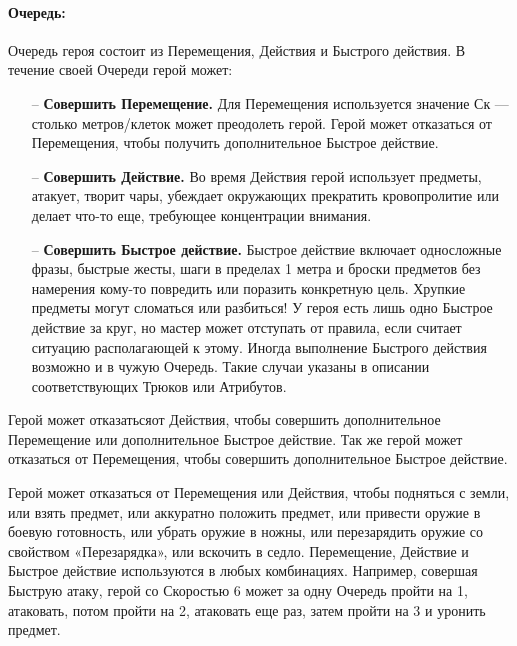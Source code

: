 \paragraph{Очередь:} Очередь героя состоит из Перемещения, Действия и Быстрого действия. В течение своей Очереди герой может:
\begin{itemize}
\item[--] \textbf{Совершить Перемещение.} Для Перемещения используется значение Ск — столько метров/клеток может преодолеть герой. Герой может отказаться от Перемещения, чтобы получить дополнительное Быстрое действие.
\item[--] \textbf{Совершить Действие.} Во время Действия герой использует предметы, атакует, творит чары, убеждает окружающих прекратить кровопролитие или делает что-то еще, требующее концентрации внимания.
\item[--] \textbf{Совершить Быстрое действие.} Быстрое действие включает односложные фразы, быстрые жесты, шаги в пределах 1 метра и броски предметов без намерения кому-то повредить или поразить конкретную цель. Хрупкие предметы могут сломаться или разбиться! У героя есть лишь одно Быстрое действие за круг, но мастер может отступать от правила, если считает ситуацию располагающей к этому. Иногда выполнение Быстрого действия возможно и в чужую Очередь. Такие случаи указаны в описании соответствующих Трюков или Атрибутов.
\end{itemize}
\begin{tcolorbox}
Герой может отказатьсяот Действия, чтобы совершить дополнительное Перемещение или дополнительное Быстрое действие.
\newline
Так же герой может отказаться от Перемещения, чтобы совершить дополнительное Быстрое действие.
\end{tcolorbox}
Герой может отказаться от Перемещения или Действия, чтобы подняться с земли, или взять предмет, или аккуратно положить предмет, или привести оружие в боевую готовность, или убрать оружие в ножны, или перезарядить оружие со свойством «Перезарядка», или вскочить в седло.
\newline
Перемещение, Действие и Быстрое действие используются в любых комбинациях. Например, совершая Быструю атаку, герой со Скоростью 6 может за одну Очередь пройти на 1, атаковать, потом пройти на 2, атаковать еще раз, затем пройти на 3 и уронить предмет.



